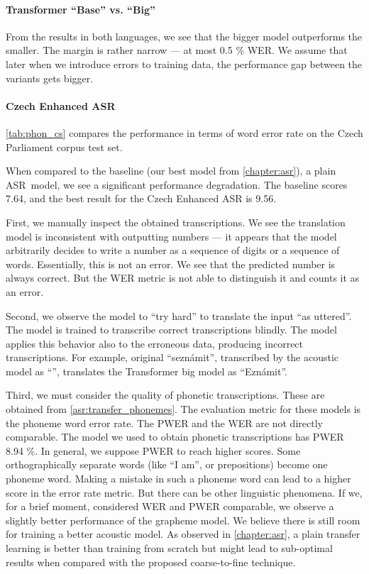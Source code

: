 \paragraph{Transformer ``Base'' vs. ``Big''} From the results in both languages, we see that the bigger model outperforms the smaller. The margin is rather narrow --- at most 0.5 \% WER. We assume that later when we introduce errors to training data, the performance gap between the variants gets bigger.

\paragraph{Czech Enhanced ASR}
\cref{tab:phon_cs} compares the performance in terms of word error rate on the Czech Parliament corpus test set. 

When compared to the baseline (our best model from \cref{chapter:asr}), a plain ASR~model, we see a significant performance degradation. The baseline scores 7.64, and the best result for the Czech Enhanced ASR is 9.56. 

First, we manually inspect the obtained transcriptions. We see the translation model is inconsistent with outputting numbers --- it appears that the model arbitrarily decides to write a number as a  sequence of digits or a sequence of words. Essentially, this is not an error. We see that the predicted number is always correct. But the WER metric is not able to distinguish it and counts it as an error.

Second, we observe the model to ``try hard'' to translate the input ``as uttered''. The model is trained to transcribe correct transcriptions blindly. The model applies this behavior also to the erroneous data, producing incorrect transcriptions. For example, original ``seznámit'', transcribed by the acoustic model as ``'', translates the Transformer big model as ``Eznámit''.    

Third, we must consider the quality of phonetic transcriptions. These are obtained from \cref{asr:transfer_phonemes}. The evaluation metric for these models is the phoneme word error rate. The PWER and the WER are not directly comparable. The model we used to obtain phonetic transcriptions has PWER 8.94 \%. In general, we suppose PWER to reach higher scores. Some orthographically separate words (like ``I am'', or prepositions) become one phoneme word. Making a mistake in such a phoneme word can lead to a higher score in the error rate metric. But there can be other linguistic phenomena. If we, for a brief moment, considered WER and PWER comparable, we observe a slightly better performance of the grapheme model. We believe there is still room for training a better acoustic model. As observed in \cref{chapter:asr}, a plain transfer learning is better than training from scratch but might lead to sub-optimal results when compared with the proposed coarse-to-fine technique. 

